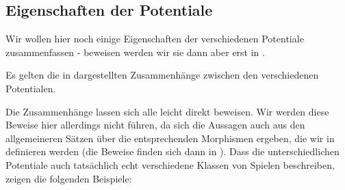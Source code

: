 \subsection{Eigenschaften der Potentiale}

Wir wollen hier noch einige Eigenschaften der verschiedenen Potentiale zusammenfassen - beweisen werden wir sie dann aber erst in .

\begin{satz}\label{satz:ZusammenaengePotentiale}
	Es gelten die in  dargestellten Zusammenhänge zwischen den verschiedenen Potentialen.
\end{satz}

Die Zusammenhänge lassen sich alle leicht direkt beweisen. Wir werden diese Beweise hier allerdings nicht führen, da sich die Aussagen auch aus den allgemeineren Sätzen über die entsprechenden Morphismen ergeben, die wir in  definieren werden (die Beweise finden sich dann in ). Dass die unterschiedlichen Potentiale auch tatsächlich echt verschiedene Klassen von Spielen beschreiben, zeigen die folgenden Beispiele: 

